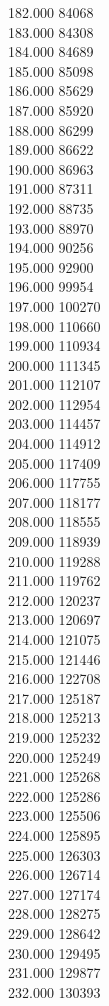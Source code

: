 { 182.000	84068 \\
 183.000	84308 \\
 184.000	84689 \\
 185.000	85098 \\
 186.000	85629 \\
 187.000	85920 \\
 188.000	86299 \\
 189.000	86622 \\
 190.000	86963 \\
 191.000	87311 \\
 192.000	88735 \\
 193.000	88970 \\
 194.000	90256 \\
 195.000	92900 \\
 196.000	99954 \\
 197.000	100270 \\
 198.000	110660 \\
 199.000	110934 \\
 200.000	111345 \\
 201.000	112107 \\
 202.000	112954 \\
 203.000	114457 \\
 204.000	114912 \\
 205.000	117409 \\
 206.000	117755 \\
 207.000	118177 \\
 208.000	118555 \\
 209.000	118939 \\
 210.000	119288 \\
 211.000	119762 \\
 212.000	120237 \\
 213.000	120697 \\
 214.000	121075 \\
 215.000	121446 \\
 216.000	122708 \\
 217.000	125187 \\
 218.000	125213 \\
 219.000	125232 \\
 220.000	125249 \\
 221.000	125268 \\
 222.000	125286 \\
 223.000	125506 \\
 224.000	125895 \\
 225.000	126303 \\
 226.000	126714 \\
 227.000	127174 \\
 228.000	128275 \\
 229.000	128642 \\
 230.000	129495 \\
 231.000	129877 \\
 232.000	130393 \\
}
